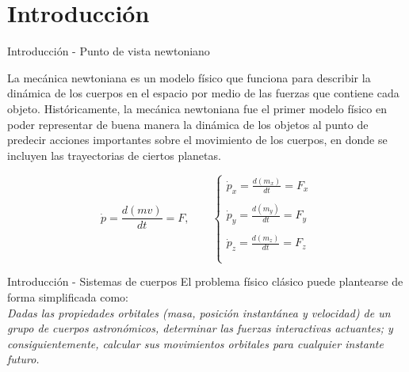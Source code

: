 \section{Introducción}
\begin{frame}{Introducción - Punto de vista newtoniano}
\begin{minipage}{0.45\linewidth}
    La mecánica newtoniana es un modelo físico
que funciona para describir la dinámica de los cuerpos en el espacio por medio
de las fuerzas que contiene cada objeto. Históricamente, la mecánica newtoniana
fue el primer modelo físico en poder representar de buena manera la dinámica de
los objetos al punto de predecir acciones importantes sobre el movimiento de los
cuerpos, en donde se incluyen las trayectorias de ciertos planetas.
\end{minipage}
\hspace{1cm}
\begin{minipage}{0.45\linewidth}
    \begin{equation*}
        \dot{p}=\frac{d(mv)}{dt} = F, \qquad \left\lbrace\begin{matrix}
            \dot{p}_x= \frac{d(m_x)}{dt} = F_x \\ \\
            \dot{p}_y= \frac{d(m_y)}{dt} = F_y \\ \\
            \dot{p}_z= \frac{d(m_z)}{dt} = F_z   \\ \\
        \end{matrix} \right.
    \end{equation*}
\end{minipage}
\end{frame}
\begin{frame}{Introducción - Sistemas de cuerpos}
    El problema físico clásico puede plantearse de forma simplificada como:\vspace{1cm}\\
    \textit{Dadas las propiedades orbitales (masa, posición instantánea y velocidad) de un grupo
    de cuerpos astronómicos, determinar las fuerzas interactivas actuantes; y consiguientemente, calcular sus movimientos orbitales para cualquier instante futuro.}
\end{frame}
